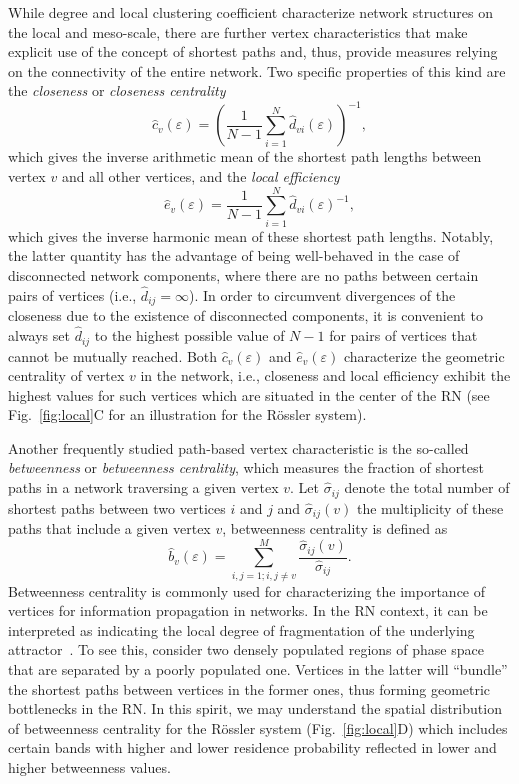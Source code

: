 While degree and local clustering coefficient characterize network structures on the local and meso-scale, there are further vertex characteristics that make explicit use of the concept of shortest paths and, thus, provide measures relying on the connectivity of the entire network. Two specific properties of this kind are the \textit{closeness} or \textit{closeness centrality}
\begin{equation}
\hat{c}_v(\varepsilon)=\left(\frac{1}{N-1}\sum_{i=1}^N \hat{d}_{vi}(\varepsilon) \right)^{-1},
\label{eq:closeness}
\end{equation}
\noindent
which gives the inverse arithmetic mean of the shortest path lengths between vertex $v$ and all other vertices, and the \textit{local efficiency}
\begin{equation}
\hat{e}_v(\varepsilon)=\frac{1}{N-1}\sum_{i=1}^N \hat{d}_{vi}(\varepsilon)^{-1},
\label{eq:locefficiency}
\end{equation}
\noindent
which gives the inverse harmonic mean of these shortest path lengths. Notably, the latter quantity has the advantage of being well-behaved in the case of disconnected network components, where there are no paths between certain pairs of vertices (i.e., $\hat{d}_{ij}=\infty$). In order to circumvent divergences of the closeness due to the existence of disconnected components, it is convenient to always set $\hat{d}_{ij}$ to the highest possible value of $N-1$ for pairs of vertices that cannot be mutually reached. Both $\hat{c}_v(\varepsilon)$ and $\hat{e}_v(\varepsilon)$ characterize the geometric centrality of vertex $v$ in the network, i.e., closeness and local efficiency exhibit the highest values for such vertices which are situated in the center of the RN (see Fig.~\ref{fig:local}C for an illustration for the R\"ossler system).

Another frequently studied path-based vertex characteristic is the so-called \textit{betweenness} or \textit{betweenness centrality}, which measures the fraction of shortest paths in a network traversing a given vertex $v$. Let $\hat{\sigma}_{ij}$ denote the total number of shortest paths between two vertices $i$ and $j$ and $\hat{\sigma}_{ij}(v)$ the multiplicity of these paths that include a given vertex $v$, betweenness centrality is defined as
\begin{equation}
\hat{b}_v(\varepsilon)=\sum_{i,j=1; i,j\neq v}^M \frac{\hat{\sigma}_{ij}(v)}{\hat{\sigma}_{ij}}.
\label{eq:betweenness}
\end{equation}
\noindent
Betweenness centrality is commonly used for characterizing the importance of vertices for information propagation in networks. In the RN context, it can be interpreted as indicating the local degree of fragmentation of the underlying attractor~\cite{Donner2010a}. To see this, consider two densely populated regions of phase space that are separated by a poorly populated one. Vertices in the latter will ``bundle'' the shortest paths between vertices in the former ones, thus forming geometric bottlenecks in the RN. In this spirit, we may understand the spatial distribution of betweenness centrality for the R\"ossler system (Fig.~\ref{fig:local}D) which includes certain bands with higher and lower residence probability reflected in lower and higher betweenness values.
           
